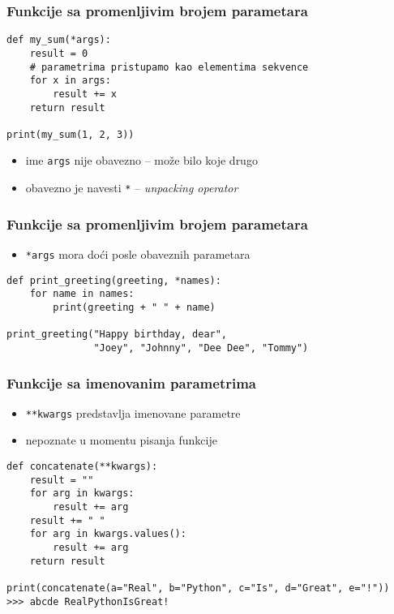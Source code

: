 \documentclass[utf8,compress,aspectratio=169]{beamer}
\begin{document}
\begin{frame}[fragile]
  \frametitle{Funkcije sa promenljivim brojem parametara}
\begin{verbatim}
def my_sum(*args):
    result = 0
    # parametrima pristupamo kao elementima sekvence
    for x in args:
        result += x
    return result

print(my_sum(1, 2, 3))
\end{verbatim}
  \begin{itemize}
    \item ime \texttt{args} nije obavezno -- može bilo koje drugo
    \item obavezno je navesti \texttt{*} -- \textit{unpacking operator}
  \end{itemize}
\end{frame}

\begin{frame}[fragile]
  \frametitle{Funkcije sa promenljivim brojem parametara}
  \begin{itemize}
    \item \texttt{*args} mora doći posle obaveznih parametara
  \end{itemize}
\begin{verbatim}
def print_greeting(greeting, *names):
    for name in names:
        print(greeting + " " + name)

print_greeting("Happy birthday, dear",
               "Joey", "Johnny", "Dee Dee", "Tommy")
\end{verbatim}
\end{frame}

\begin{frame}[fragile]
  \frametitle{Funkcije sa imenovanim parametrima}
  \begin{itemize}
    \item \texttt{**kwargs} predstavlja imenovane parametre
    \item nepoznate u momentu pisanja funkcije
  \end{itemize}
\begin{verbatim}
def concatenate(**kwargs):
    result = ""
    for arg in kwargs:
        result += arg
    result += " "
    for arg in kwargs.values():
        result += arg
    return result

print(concatenate(a="Real", b="Python", c="Is", d="Great", e="!"))
>>> abcde RealPythonIsGreat!
\end{verbatim}
\end{frame}
\end{document}
